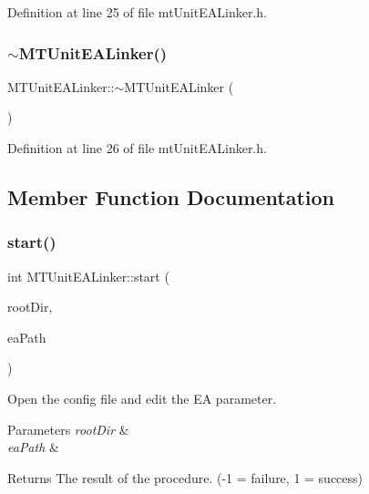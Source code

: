 Definition at line 25 of file mt\+Unit\+E\+A\+Linker.\+h.

\mbox{\label{class_m_t_unit_e_a_linker_ac9e5096b4e07298672b442e28ea96880}} 
\subsubsection{\texorpdfstring{$\sim$\+M\+T\+Unit\+E\+A\+Linker()}{~MTUnitEALinker()}}
{\footnotesize\ttfamily M\+T\+Unit\+E\+A\+Linker\+::$\sim$\+M\+T\+Unit\+E\+A\+Linker (\begin{DoxyParamCaption}{ }\end{DoxyParamCaption})\hspace{0.3cm}{\ttfamily [inline]}}



Definition at line 26 of file mt\+Unit\+E\+A\+Linker.\+h.



\subsection{Member Function Documentation}
\mbox{\label{class_m_t_unit_e_a_linker_acf164d0bb5d6769c83832fdcfb45d763}} 
\subsubsection{\texorpdfstring{start()}{start()}}
{\footnotesize\ttfamily int M\+T\+Unit\+E\+A\+Linker\+::start (\begin{DoxyParamCaption}\item[{Q\+String}]{root\+Dir,  }\item[{Q\+String}]{ea\+Path }\end{DoxyParamCaption})}



Open the config file and edit the EA parameter. 


\begin{DoxyParams}{Parameters}
{\em root\+Dir} & \\
\hline
{\em ea\+Path} & \\
\hline
\end{DoxyParams}
\begin{DoxyReturn}{Returns}
The result of the procedure. (-\/1 = failure, 1 = success) 
\end{DoxyReturn}


